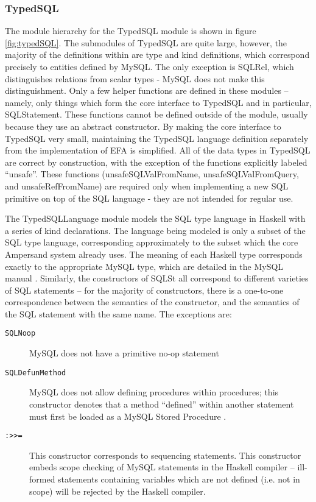 \subsubsection{TypedSQL}
The module hierarchy for the TypedSQL module is shown in
figure \ref{fig:typedSQL}. The submodules of TypedSQL are quite large, 
however,
the majority of the definitions within are type and kind definitions, which 
correspond 
precisely to entities defined by MySQL. The only exception is SQLRel, which 
distinguishes
relations from scalar types - MySQL does not make this distinguishment. 
Only a few
helper functions are defined in these modules -- namely, only things which 
form
the core interface to TypedSQL and in particular, SQLStatement. These 
functions
cannot be defined outside of the module, usually because they use an 
abstract
constructor. By making the core interface to TypedSQL very small, 
maintaining 
the TypedSQL language definition separately from the implementation of 
EFA is simplified. All of the data types in TypedSQL are correct by 
construction, with the exception of the functions explicitly labeled 
``unsafe''.
These functions (unsafeSQLValFromName, unsafeSQLValFromQuery, and 
unsafeRefFromName)
are required only when implementing a new SQL primitive on top of the SQL
language - they are not intended for regular use. 

The TypedSQLLanguage module models the SQL type language in Haskell with a
series of kind declarations. The language being modeled is only a subset of 
the
SQL type language, corresponding approximately to the subset which the core
Ampersand system already uses. The meaning of each Haskell type corresponds
exactly to the appropriate MySQL type, which are detailed in the MySQL
manual \citep{mySQLman}. Similarly, the constructors of SQLSt all correspond
to different varieties of SQL statements -- for the majority of 
constructors,
there is a one-to-one correspondence between the semantics of the 
constructor,
and the semantics of the SQL statement with the same name. The exceptions 
are:     
\begin{description}
\item[\texttt{SQLNoop}] MySQL does not have a primitive no-op statement
\item[\texttt{SQLDefunMethod}]  MySQL does not allow defining 
procedures within procedures; 
this constructor denotes that a method ``defined'' within another 
statement must 
first be loaded as a MySQL Stored Procedure \citep{mySQLman}.
\item[\texttt{:>>=}] This constructor corresponds to sequencing 
statements. This constructor
embeds scope checking of MySQL statements in the Haskell compiler -- 
ill-formed statements
containing variables which are not defined (i.e. not in scope) will be 
rejected by the Haskell
compiler. 
\end{description}


